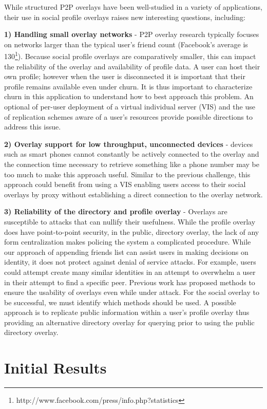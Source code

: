 \documentclass{IEEEtran}
\begin{document}
While structured P2P overlays have been well-studied in a variety of
applications, their use in social profile overlays raises new interesting
questions, including:

{\bf 1) Handling small overlay networks} - P2P overlay research typically
focuses on networks larger than the typical user's friend count (Facebook's
average is 130\footnote{http://www.facebook.com/press/info.php?statistics}).
Because social profile overlays are comparatively smaller, this can impact the
reliability of the overlay and availability of profile data.  A user can host
their own profile; however when the user is disconnected it is important that
their profile remains available even under churn. It is thus important to
characterize churn in this application to understand how to best approach this
problem. An optional of per-user deployment of a virtual individual server
(VIS) and the use of replication schemes aware of a user's resources provide
possible directions to address this issue.

{\bf 2) Overlay support for low throughput, unconnected devices} - devices such
as smart phones cannot constantly be actively connected to the overlay and the
connection time necessary to retrieve something like a phone number may be too
much to make this approach useful.  Similar to the previous challenge, this
approach could benefit from using a VIS enabling users access to their social
overlays by proxy without establishing a direct connection to the overlay
network.

{\bf 3) Reliability of the directory and profile overlay} - Overlays are
susceptible to attacks that can nullify their usefulness.  While the profile
overlay does have point-to-point security, in the public, directory overlay,
the lack of any form centralization makes policing the system a complicated
procedure.  While our approach of appending friends list can assist users in
making decisions on identity, it does not protect against denial of service
attacks.  For example, users could attempt create many similar identities in
an attempt to overwhelm a user in their attempt to find a specific peer.
Previous work has proposed methods to ensure the usability of overlays even
while under attack.  For the social overlay to be successful, we must identify
which methods should be used. A possible approach is to replicate public
information within a user's profile overlay thus providing an alternative
directory overlay for querying prior to using the public directory overlay.

\section{Initial Results}
\label{experiments}
\end{document}
